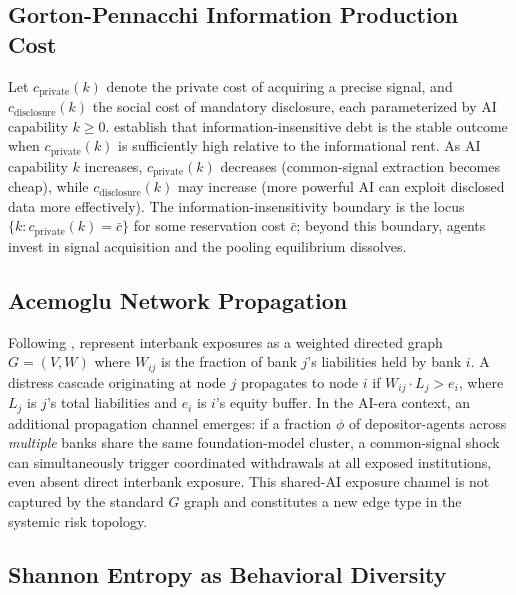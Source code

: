 \subsection{Gorton-Pennacchi Information Production Cost}

Let $c_{\text{private}}(k)$ denote the private cost of acquiring a precise signal, and $c_{\text{disclosure}}(k)$ the social cost of mandatory disclosure, each parameterized by AI capability $k \geq 0$. \citet{gorton1990financial} establish that information-insensitive debt is the stable outcome when $c_{\text{private}}(k)$ is sufficiently high relative to the informational rent. As AI capability $k$ increases, $c_{\text{private}}(k)$ decreases (common-signal extraction becomes cheap), while $c_{\text{disclosure}}(k)$ may increase (more powerful AI can exploit disclosed data more effectively). The information-insensitivity boundary is the locus $\{k : c_{\text{private}}(k) = \bar{c}\}$ for some reservation cost $\bar{c}$; beyond this boundary, agents invest in signal acquisition and the pooling equilibrium dissolves.


\subsection{Acemoglu Network Propagation}

Following \citet{acemoglu2015systemic}, represent interbank exposures as a weighted directed graph $G = (V, W)$ where $W_{ij}$ is the fraction of bank $j$'s liabilities held by bank $i$. A distress cascade originating at node $j$ propagates to node $i$ if $W_{ij} \cdot L_j > e_i$, where $L_j$ is $j$'s total liabilities and $e_i$ is $i$'s equity buffer. In the AI-era context, an additional propagation channel emerges: if a fraction $\phi$ of depositor-agents across \emph{multiple} banks share the same foundation-model cluster, a common-signal shock can simultaneously trigger coordinated withdrawals at all exposed institutions, even absent direct interbank exposure. This shared-AI exposure channel is not captured by the standard $G$ graph and constitutes a new edge type in the systemic risk topology.

\subsection{Shannon Entropy as Behavioral Diversity}


